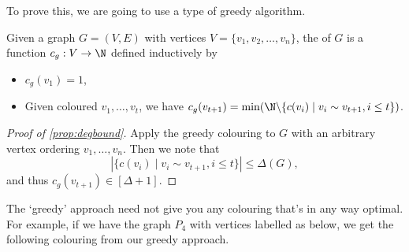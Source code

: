 To prove this, we are going to use a type of greedy algorithm.

\begin{definition}
	Given a graph $G = (V, E)$ with vertices $V = \{v_1, v_2, \dots, v_n\}$, the  of $G$ is a function $c_g: V\rightarrow \N$ defined inductively by
	\begin{itemize}
		\item $c_g(v_1) = 1$,
		\item Given coloured $v_1, \dots, v_t$, we have $c_g(v_{t + 1}) = \min(\N\backslash \{c(v_i) \mid v_i \sim v_{t + 1}, i \leq t\})$.
	\end{itemize}
\end{definition}

\begin{proof}[Proof of \autoref{prop:degbound}]
	Apply the greedy colouring to $G$ with an arbitrary vertex ordering $v_1, \dots, v_n$. Then we note that
	$$
	|\{c(v_i) \mid v_i \sim v_{t + 1}, i \leq t\}| \leq \Delta(G),
	$$
	and thus $c_g(v_{t + 1}) \in [\Delta + 1]$.
\end{proof}

The `greedy' approach need not give you any colouring that's in any way optimal. For example, if we have the graph $P_4$ with vertices labelled as below, we get the following colouring from our greedy approach.


